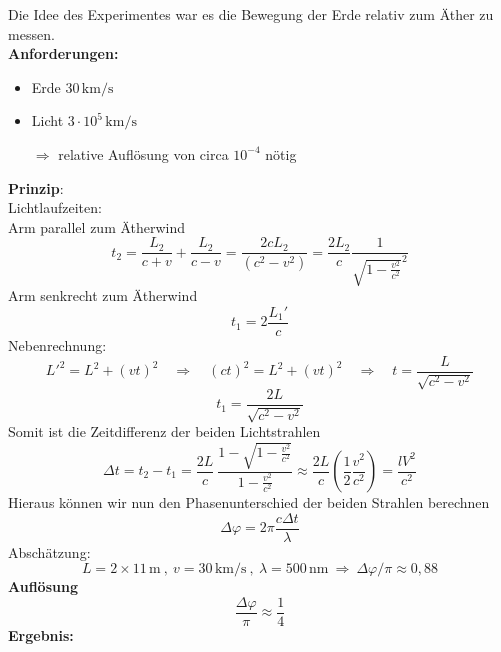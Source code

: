 \documentclass[titlepage,11pt,a4paper,ngerman]{report}
\newcommand{\tx}[1]{\textrm{#1}}
\begin{document}
Die Idee des Experimentes war es die Bewegung der Erde relativ zum Äther zu messen.\\
\textbf{Anforderungen:}
\begin{itemize}
	\item Erde $ 30 \, \tx{km} \slash \tx{s} $
	\item Licht $ 3 \cdot 10^{5} \, \tx{km} \slash \tx{s}  $
	\item[$ \Rightarrow $] relative Auflösung von circa $ 10^{-4} $ nötig
\end{itemize}
%
%
%
%
\textbf{Prinzip}:\\
Lichtlaufzeiten:\\
Arm parallel zum Ätherwind
\begin{equation*}
t_2 = \frac{L_2}{c+v} + \frac{L_2}{c-v} = \frac{2cL_2}{(c^2-v^2)} = \frac{2 L_2}{c} \frac{1}{\sqrt{1 - \frac{v^2}{c^2}}^2}
\end{equation*}
Arm senkrecht zum Ätherwind
\begin{equation*}
t_1 = 2 \frac{L_1'}{c}
\end{equation*}
Nebenrechnung:
\begin{equation*}
L'^2 = L^2 + (vt)^2 \quad \Rightarrow \quad (ct)^2 = L^2 + (vt)^2 \quad \Rightarrow \quad t = \frac{L}{\sqrt{c^2 - v^2}}
\end{equation*}
\begin{equation*}
t_1 = \frac{2 L}{\sqrt{c^2 - v^2}}
\end{equation*}
Somit ist die Zeitdifferenz der beiden Lichtstrahlen
\begin{equation*}
\Delta t = t_2 - t_1 = \frac{2L}{c} \ \frac{1 - \sqrt{1 - \frac{v^2}{c^2}}}{1 - \frac{v^2}{c^2}} \approx \frac{2L}{c} \left(\frac{1}{2} \frac{v^2}{c^2}\right) = \frac{lV^2}{c^2}
\end{equation*}
Hieraus können wir nun den Phasenunterschied der beiden Strahlen berechnen
\begin{equation*}
\Delta \varphi = 2 \pi \frac{c \Delta t}{\lambda}
\end{equation*}
Abschätzung:
\begin{equation*}
L = 2 \times 11 \, \tx{m} \ , \ v = 30 \, \tx{km} \slash \tx{s} \ , \ \lambda = 500 \, \tx{nm} \ \Rightarrow \ \Delta \varphi \slash \pi \approx 0{,}88
\end{equation*}
\textbf{Auflösung}
\begin{equation*}
\frac{\Delta \varphi}{\pi} \approx \frac{1}{4}
\end{equation*}
\textbf{Ergebnis:}\\
\end{document}
